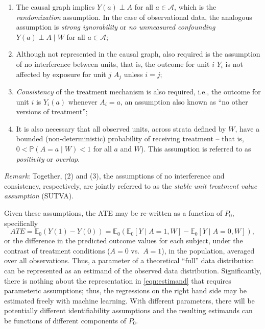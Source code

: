 \documentclass[
  12pt, krantz2,
]{book}
\providecommand{\tightlist}{%
  \setlength{\itemsep}{0pt}\setlength{\parskip}{0pt}}
\theoremstyle{definition}
\theoremstyle{definition}
\theoremstyle{definition}
\newcommand{\1}{\mathbbm{1}}
\begin{document}
\begin{enumerate}
\def\labelenumi{\arabic{enumi}.}
\tightlist
\item
  The causal graph implies \(Y(a) \perp A\) for all \(a \in \mathcal{A}\), which
  is the \emph{randomization} assumption. In the case of observational data, the
  analogous assumption is \emph{strong ignorability} or \emph{no unmeasured confounding}
  \(Y(a) \perp A \mid W\) for all \(a \in \mathcal{A}\);
\item
  Although not represented in the causal graph, also required is the assumption
  of no interference between units, that is, the outcome for unit \(i\) \(Y_i\) is
  not affected by exposure for unit \(j\) \(A_j\) unless \(i=j\);
\item
  \emph{Consistency} of the treatment mechanism is also required, i.e., the outcome
  for unit \(i\) is \(Y_i(a)\) whenever \(A_i = a\), an assumption also known as ``no
  other versions of treatment'';
\item
  It is also necessary that all observed units, across strata defined by \(W\),
  have a bounded (non-deterministic) probability of receiving treatment --
  that is, \(0 < \mathbb{P}(A = a \mid W) < 1\) for all \(a\) and \(W\)). This assumption
  is referred to as \emph{positivity} or \emph{overlap}.
\end{enumerate}

\emph{Remark}: Together, (2) and (3), the assumptions of no interference and
consistency, respectively, are jointly referred to as the \emph{stable unit
treatment value assumption} (SUTVA).

Given these assumptions, the ATE may be re-written as a function of \(P_0\),
specifically
\begin{equation}\label{eqn:estimand}
  ATE = \mathbb{E}_0(Y(1) - Y(0)) = \mathbb{E}_0
    \left(\mathbb{E}_0[Y \mid A = 1, W] - \mathbb{E}_0[Y \mid A = 0, W]\right),
\end{equation}
or the difference in the predicted outcome values for each subject, under the
contrast of treatment conditions (\(A = 0\) vs.~\(A = 1\)), in the population,
averaged over all observations. Thus, a parameter of a theoretical ``full'' data
distribution can be represented as an estimand of the observed data
distribution. Significantly, there is nothing about the representation in
\ref{eqn:estimand} that requires parameteric assumptions; thus, the regressions
on the right hand side may be estimated freely with machine learning. With
different parameters, there will be potentially different identifiability
assumptions and the resulting estimands can be functions of different components
of \(P_0\).
\end{document}
